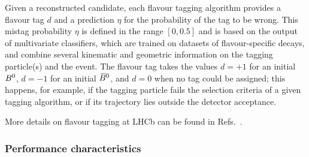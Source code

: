 Given a reconstructed candidate, each flavour tagging algorithm provides a
flavour tag $d$ and a prediction $\eta$ for the probability of the tag to be
wrong. This mistag probability $\eta$ is defined in the range $[0,0.5]$ and is
based on the output of multivariate classifiers, which are trained on datasets
of flavour-specific decays, and combine several kinematic and geometric
information on the tagging particle(s) and the event. The flavour tag takes the
values $d=+1$ for an initial $B^0$, $d=-1$ for an initial $\kern 0.18em\overline{\kern -0.18em B}{}^0$, and $d=0$ when
no tag could be assigned; this happens, for example, if the tagging particle fails 
the selection criteria of a given tagging algorithm, or if its trajectory lies outside
the detector acceptance.

More details on flavour tagging at LHCb can be found in
Refs.~\cite{Grabalosa:2012qra,LHCb-CONF-2011-003,LaThuile}.

\subsubsection{Performance characteristics}
\label{sec:tagging:characteristics}

